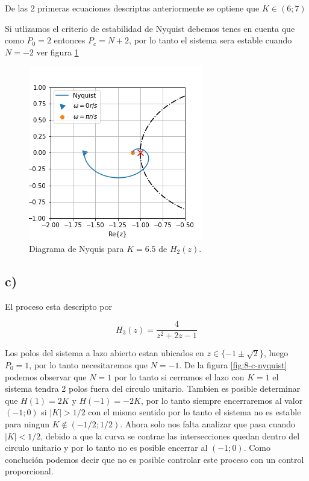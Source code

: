 \documentclass{article}
\begin{document}
            De las 2 primeras ecuaciones descriptas anteriormente se optiene que $K\in(6;7)$

            Si utlizamos el criterio de estabilidad de Nyquist debemos tenes en cuenta que como $P_0=2$ entonces $P_c=N + 2$, por lo tanto el 
            sistema sera estable cuando $N=-2$ ver figura \ref{fig:8-b-nyquist}

            \begin{figure}[!htb]
                \centering
                \includegraphics[width=.4\textwidth]{Img/8-b-nyquist}
                \caption{Diagrama de Nyquis para $K=6.5$ de $H_2(z)$.}
                \label{fig:8-b-nyquist}
            \end{figure}

        \subsection{c)}

        El proceso esta descripto por 

        \begin{equation}
            H_3(z) = \frac{4}{z^2 + 2z -1}
        \end{equation}

        Los polos del sistema a lazo abierto estan ubicados en $z \in \{ -1 \pm \sqrt{2}  \}$, luego $P_0=1$, por lo 
        tanto necesitaremos que $N=-1$. De la figura \ref{fig:8-c-nyquist} podemos observar que $N=1$ por lo tanto si 
        cerramos el lazo con $K=1$ el sistema tendra 2 polos fuera del circulo unitario. Tambien es posible determinar 
        que $H(1) = 2K$ y $H(-1)=-2K$, por lo tanto siempre encerraremos al valor $(-1;0)$ si $|K|>1/2$ con el mismo sentido 
        por lo tanto el sistema no es estable para ningun $K \notin (-1/2 ; 1/2)$. Ahora solo nos falta analizar que 
        pasa cuando $|K|<1/2$, debido a que la curva se contrae las intersecciones quedan dentro del circulo unitario 
        y por lo tanto no es posible encerrar al $(-1;0)$. Como conclución podemos decir que no es posible controlar 
        este proceso con un control proporcional.
\end{document}
